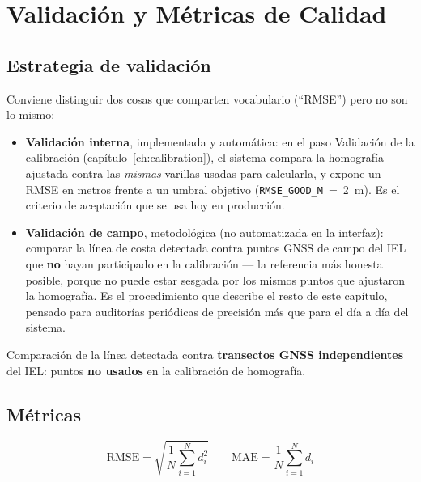 \chapter{Validación y Métricas de Calidad}
\label{ch:validation}

\section{Estrategia de validación}

\begin{infobox}
Conviene distinguir dos cosas que comparten vocabulario (``RMSE'') pero no son lo mismo:
\begin{itemize}[leftmargin=1.5em]
  \item \textbf{Validación interna}, implementada y automática: en el paso Validación de la
        calibración (capítulo~\ref{ch:calibration}), el sistema compara la homografía ajustada
        contra las \emph{mismas} varillas usadas para calcularla, y expone un RMSE en metros
        frente a un umbral objetivo (\texttt{RMSE\_GOOD\_M}~=~2~m). Es el criterio de
        aceptación que se usa hoy en producción.
  \item \textbf{Validación de campo}, metodológica (no automatizada en la interfaz): comparar la
        línea de costa detectada contra puntos GNSS de campo del IEL que \textbf{no} hayan
        participado en la calibración — la referencia más honesta posible, porque no puede
        estar sesgada por los mismos puntos que ajustaron la homografía. Es el procedimiento que
        describe el resto de este capítulo, pensado para auditorías periódicas de precisión más
        que para el día a día del sistema.
\end{itemize}
\end{infobox}

Comparación de la línea detectada contra \textbf{transectos GNSS independientes} del IEL:
puntos \textbf{no usados} en la calibración de homografía.

\section{Métricas}

\begin{equation}
  \text{RMSE} = \sqrt{\frac{1}{N} \sum_{i=1}^{N} d_i^2}
  \qquad
  \text{MAE} = \frac{1}{N} \sum_{i=1}^{N} d_i
\end{equation}


